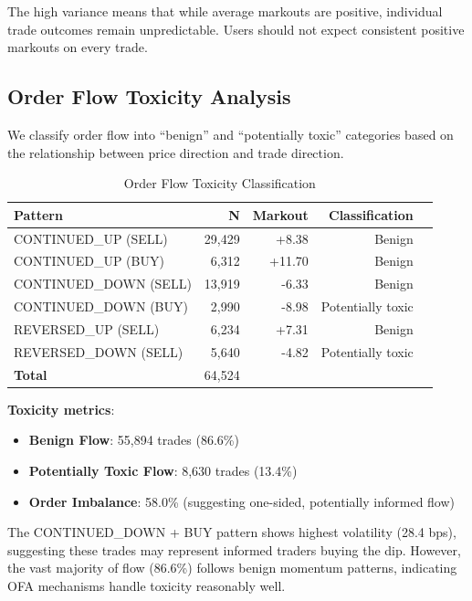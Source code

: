 \documentclass[12pt,a4paper]{article}
\begin{document}
The high variance means that while average markouts are positive, individual trade outcomes remain unpredictable. Users should not expect consistent positive markouts on every trade.

\subsection{Order Flow Toxicity Analysis}

We classify order flow into ``benign'' and ``potentially toxic'' categories based on the relationship between price direction and trade direction.

\begin{table}[H]
\centering
\caption{Order Flow Toxicity Classification}
\label{tab:toxicity}
\begin{tabular}{lrrrl}
\toprule
\textbf{Pattern} & \textbf{N} & \textbf{Markout} & \textbf{Classification} \\
\midrule
CONTINUED\_UP (SELL) & 29,429 & +8.38 & Benign \\
CONTINUED\_UP (BUY) & 6,312 & +11.70 & Benign \\
CONTINUED\_DOWN (SELL) & 13,919 & -6.33 & Benign \\
CONTINUED\_DOWN (BUY) & 2,990 & -8.98 & Potentially toxic \\
REVERSED\_UP (SELL) & 6,234 & +7.31 & Benign \\
REVERSED\_DOWN (SELL) & 5,640 & -4.82 & Potentially toxic \\
\midrule
\textbf{Total} & 64,524 & & \\
\bottomrule
\end{tabular}
\end{table}

\textbf{Toxicity metrics}:
\begin{itemize}
    \item \textbf{Benign Flow}: 55,894 trades (86.6\%)
    \item \textbf{Potentially Toxic Flow}: 8,630 trades (13.4\%)
    \item \textbf{Order Imbalance}: 58.0\% (suggesting one-sided, potentially informed flow)
\end{itemize}

The CONTINUED\_DOWN + BUY pattern shows highest volatility (28.4 bps), suggesting these trades may represent informed traders buying the dip. However, the vast majority of flow (86.6\%) follows benign momentum patterns, indicating OFA mechanisms handle toxicity reasonably well.
\end{document}
